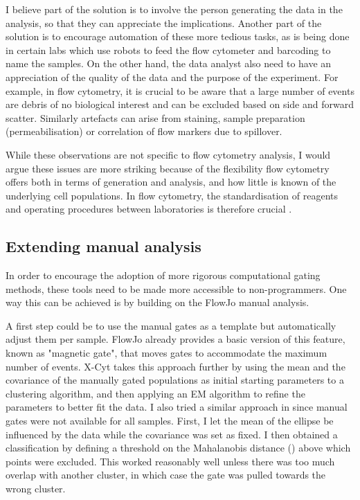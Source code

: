 I believe part of the solution is to involve the person generating the data in the analysis, so that they can appreciate the implications.
Another part of the solution is to encourage automation of these more tedious tasks, as is being done in certain labs which use robots to feed the flow cytometer and barcoding to name the samples.
On the other hand, the data analyst also need to have an appreciation of the quality of the data and the purpose of the experiment.
For example, in flow cytometry, it is crucial to be aware that a large number of events are debris of no biological interest and can be excluded based on side and forward scatter.
Similarly artefacts can arise from staining, sample preparation (permeabilisation) or correlation of flow markers due to spillover.

While these observations are not specific to flow cytometry analysis, I would argue these issues are more striking because of the flexibility flow cytometry offers both in terms of generation and analysis, and how little is known of the underlying cell populations.
In flow cytometry, the standardisation of reagents and operating procedures between laboratories is therefore crucial \citep{Maecker:2012gl}.

\subsection{Extending manual analysis}

In order to encourage the adoption of more rigorous computational gating methods, these tools need to be made more accessible to non-programmers.
One way this can be achieved is by building on the FlowJo manual analysis.


A first step could be to use the manual gates as a template but automatically adjust them per sample.
FlowJo already provides a basic version of this feature, known as "magnetic gate", that moves gates to accommodate the maximum number of events.
X-Cyt \citep{Hu:2013bg} takes this approach further by using the mean and the covariance of the manually gated populations as initial starting parameters to a clustering algorithm, and then applying an \gls{EM} algorithm to refine the parameters to better fit the data.
I also tried a similar approach in  since manual gates were not available for all samples.
First, I let the mean of the ellipse be influenced by the data while the covariance was set as fixed.
I then obtained a classification by defining a threshold on the Mahalanobis distance () above which points were excluded.
This worked reasonably well unless there was too much overlap with another cluster, in which case the gate was pulled towards the wrong cluster.


